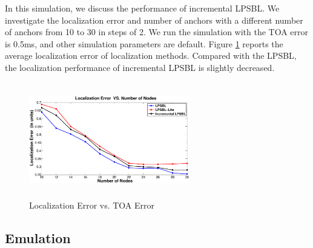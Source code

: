 In this simulation, we discuss the performance of incremental LPSBL.
We investigate the localization error and number of anchors with a different number of anchors from 10 to 30 in steps of 2. 
 We run the simulation with the TOA error is 0.5ms, and other simulation parameters are default. 
 Figure \ref{Incremental} reports the average localization error of localization methods. 
 Compared with the LPSBL, the localization performance of incremental LPSBL is slightly decreased.
 
    \begin{figure}[htb]       
            \centering
            \includegraphics[height=5.0cm,width=7.0cm]{image/Incremental.eps}
                \caption{Localization Error vs. TOA Error}
             \vspace{-8mm}
             \label{Incremental}
        \end{figure}
		


  \subsection{Emulation}

